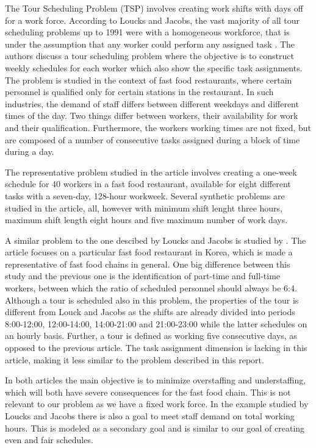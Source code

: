 The Tour Scheduling Problem (TSP) involves creating work shifts with days off for a work force. According to Loucks and Jacobs, the vast majority of all tour scheduling problems up to 1991 were with a homogeneous workforce, that is under the assumption that any worker could perform any assigned task \cite{loucks_1991}. The authors discuss a tour scheduling problem where the objective is to construct weekly schedules for each worker which also show the specific task assignments. The problem is studied in the context of fast food restaurants, where certain personnel is qualified only for certain stations in the restaurant. In such industries, the demand of staff differs between different weekdays and different times of the day. Two things differ between workers, their availability for work and their qualification. Furthermore, the workers working times are not fixed, but are composed of a number of consecutive tasks assigned during a block of time during a day.

The representative problem studied in the article involves creating a one-week schedule for 40 workers in a fast food restaurant, available for eight different tasks with a seven-day, 128-hour workweek. Several synthetic problems are studied in the article, all, however with minimum shift lenght three hours, maximum shift length eight hours and five maximum number of work days.

A similar problem to the one descibed by Loucks and Jacobs is studied by \cite{choi_hwang_park_2009}. The article focuses on a particular fast food restaurant in Korea, which is made a representative of fast food chains in general. One big difference between this study and the previous one is the identification of part-time and full-time workers, between which the ratio of scheduled personnel should always be 6:4. Although a tour is scheduled also in this problem, the properties of the tour is different from Louck and Jacobs as the shifts are already divided into periods 8:00-12:00, 12:00-14:00, 14:00-21:00 and 21:00-23:00 while the latter schedules on an hourly basis. Further, a tour is defined as working five consecutive days, as opposed to the previous article. The task assignment dimension is lacking in this article, making it less similar to the problem described in this report.

In both articles the main objective is to minimize overstaffing and understaffing, which will both have severe consequences for the fast food chain. This is not relevant to our problem as we have a fixed work force. In the example studied by Loucks and Jacobs there is also a goal to meet staff demand on total working hours. This is modeled as a secondary goal and is similar to our goal of creating even and fair schedules.



